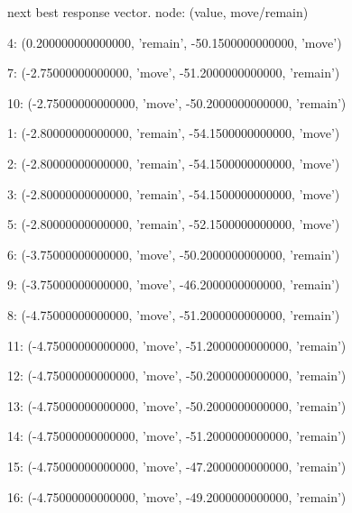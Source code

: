 \begin{figure}[h!]
\end{figure}
\clearpage \pagebreak


 next best response vector.  node: (value, move/remain)


4: (0.200000000000000, 'remain', -50.1500000000000, 'move')


7: (-2.75000000000000, 'move', -51.2000000000000, 'remain')


10: (-2.75000000000000, 'move', -50.2000000000000, 'remain')


1: (-2.80000000000000, 'remain', -54.1500000000000, 'move')


2: (-2.80000000000000, 'remain', -54.1500000000000, 'move')


3: (-2.80000000000000, 'remain', -54.1500000000000, 'move')


5: (-2.80000000000000, 'remain', -52.1500000000000, 'move')


6: (-3.75000000000000, 'move', -50.2000000000000, 'remain')


9: (-3.75000000000000, 'move', -46.2000000000000, 'remain')


8: (-4.75000000000000, 'move', -51.2000000000000, 'remain')


11: (-4.75000000000000, 'move', -51.2000000000000, 'remain')


12: (-4.75000000000000, 'move', -50.2000000000000, 'remain')


13: (-4.75000000000000, 'move', -50.2000000000000, 'remain')


14: (-4.75000000000000, 'move', -51.2000000000000, 'remain')


15: (-4.75000000000000, 'move', -47.2000000000000, 'remain')


16: (-4.75000000000000, 'move', -49.2000000000000, 'remain')


